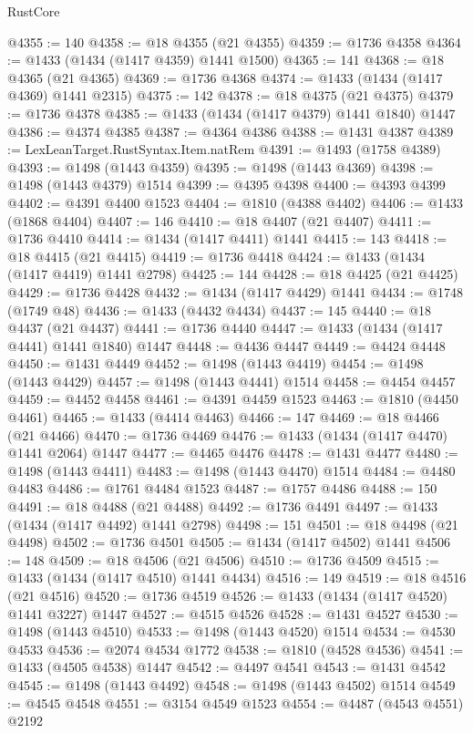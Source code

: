 \begin{lexlean}{RustCore}
\begin{coremodule}
@4355 := 140
@4358 := @18 @4355 (@21 @4355)
@4359 := @1736 @4358
@4364 := @1433 (@1434 (@1417 @4359) @1441 @1500)
@4365 := 141
@4368 := @18 @4365 (@21 @4365)
@4369 := @1736 @4368
@4374 := @1433 (@1434 (@1417 @4369) @1441 @2315)
@4375 := 142
@4378 := @18 @4375 (@21 @4375)
@4379 := @1736 @4378
@4385 := @1433 (@1434 (@1417 @4379) @1441 @1840) @1447
@4386 := @4374 @4385
@4387 := @4364 @4386
@4388 := @1431 @4387
@4389 := LexLeanTarget.RustSyntax.Item.natRem
@4391 := @1493 (@1758 @4389)
@4393 := @1498 (@1443 @4359)
@4395 := @1498 (@1443 @4369)
@4398 := @1498 (@1443 @4379) @1514
@4399 := @4395 @4398
@4400 := @4393 @4399
@4402 := @4391 @4400 @1523
@4404 := @1810 (@4388 @4402)
@4406 := @1433 (@1868 @4404)
@4407 := 146
@4410 := @18 @4407 (@21 @4407)
@4411 := @1736 @4410
@4414 := @1434 (@1417 @4411) @1441
@4415 := 143
@4418 := @18 @4415 (@21 @4415)
@4419 := @1736 @4418
@4424 := @1433 (@1434 (@1417 @4419) @1441 @2798)
@4425 := 144
@4428 := @18 @4425 (@21 @4425)
@4429 := @1736 @4428
@4432 := @1434 (@1417 @4429) @1441
@4434 := @1748 (@1749 @48)
@4436 := @1433 (@4432 @4434)
@4437 := 145
@4440 := @18 @4437 (@21 @4437)
@4441 := @1736 @4440
@4447 := @1433 (@1434 (@1417 @4441) @1441 @1840) @1447
@4448 := @4436 @4447
@4449 := @4424 @4448
@4450 := @1431 @4449
@4452 := @1498 (@1443 @4419)
@4454 := @1498 (@1443 @4429)
@4457 := @1498 (@1443 @4441) @1514
@4458 := @4454 @4457
@4459 := @4452 @4458
@4461 := @4391 @4459 @1523
@4463 := @1810 (@4450 @4461)
@4465 := @1433 (@4414 @4463)
@4466 := 147
@4469 := @18 @4466 (@21 @4466)
@4470 := @1736 @4469
@4476 := @1433 (@1434 (@1417 @4470) @1441 @2064) @1447
@4477 := @4465 @4476
@4478 := @1431 @4477
@4480 := @1498 (@1443 @4411)
@4483 := @1498 (@1443 @4470) @1514
@4484 := @4480 @4483
@4486 := @1761 @4484 @1523
@4487 := @1757 @4486
@4488 := 150
@4491 := @18 @4488 (@21 @4488)
@4492 := @1736 @4491
@4497 := @1433 (@1434 (@1417 @4492) @1441 @2798)
@4498 := 151
@4501 := @18 @4498 (@21 @4498)
@4502 := @1736 @4501
@4505 := @1434 (@1417 @4502) @1441
@4506 := 148
@4509 := @18 @4506 (@21 @4506)
@4510 := @1736 @4509
@4515 := @1433 (@1434 (@1417 @4510) @1441 @4434)
@4516 := 149
@4519 := @18 @4516 (@21 @4516)
@4520 := @1736 @4519
@4526 := @1433 (@1434 (@1417 @4520) @1441 @3227) @1447
@4527 := @4515 @4526
@4528 := @1431 @4527
@4530 := @1498 (@1443 @4510)
@4533 := @1498 (@1443 @4520) @1514
@4534 := @4530 @4533
@4536 := @2074 @4534 @1772
@4538 := @1810 (@4528 @4536)
@4541 := @1433 (@4505 @4538) @1447
@4542 := @4497 @4541
@4543 := @1431 @4542
@4545 := @1498 (@1443 @4492)
@4548 := @1498 (@1443 @4502) @1514
@4549 := @4545 @4548
@4551 := @3154 @4549 @1523
@4554 := @4487 (@4543 @4551) @2192

\end{coremodule}
\end{lexlean}

